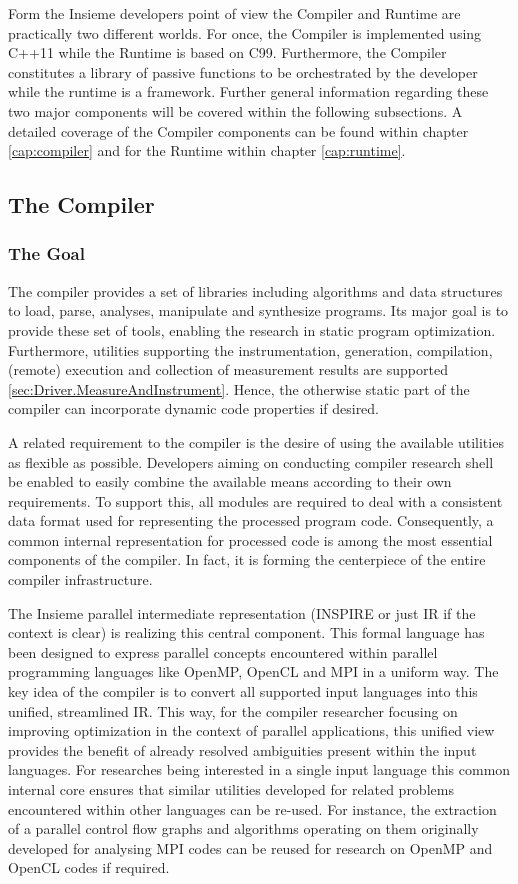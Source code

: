 Form the Insieme developers point of view the Compiler and Runtime are
practically two different worlds. For once, the Compiler is implemented using
C++11 while the Runtime is based on C99. Furthermore, the Compiler constitutes a
library of passive functions to be orchestrated by the developer while the
runtime is a framework. Further general information regarding these two major
components will be covered within the following subsections. A detailed
coverage of the Compiler components can be found within chapter
\ref{cap:compiler} and for the Runtime within chapter \ref{cap:runtime}.


\subsection{The Compiler}

\subsubsection{The Goal}
The compiler provides a set of libraries including algorithms and data
structures to load, parse, analyses, manipulate and synthesize programs. Its
major goal is to provide these set of tools, enabling the research in
static program optimization. Furthermore, utilities supporting the
instrumentation, generation, compilation, (remote) execution and collection of
measurement results are supported \ref{sec:Driver.MeasureAndInstrument}. Hence,
the otherwise static part of the compiler can incorporate dynamic code
properties if desired.

A related requirement to the compiler is the desire of using the available
utilities as flexible as possible. Developers aiming on conducting compiler
research shell be enabled to easily combine the available means according to
their own requirements. To support this, all modules are required to deal with a
consistent data format used for representing the processed program code.
Consequently, a common internal representation for processed code is among the
most essential components of the compiler. In fact, it is forming the
centerpiece of the entire compiler infrastructure.

The Insieme parallel intermediate representation (INSPIRE or just IR if the
context is clear) is realizing this central component. This formal language has
been designed to express parallel concepts encountered within parallel
programming languages like OpenMP, OpenCL and MPI in a uniform way. The key idea
of the compiler is to convert all supported input languages into this unified,
streamlined IR. This way, for the compiler researcher focusing on improving
optimization in the context of parallel applications, this unified view provides
the benefit of already resolved ambiguities present within the input languages.
For researches being interested in a single input language this common internal
core ensures that similar utilities developed for related problems encountered
within other languages can be re-used. For instance, the extraction of a
parallel control flow graphs and algorithms operating on them
originally developed for analysing MPI codes can be reused for research on
OpenMP and OpenCL codes if required.


